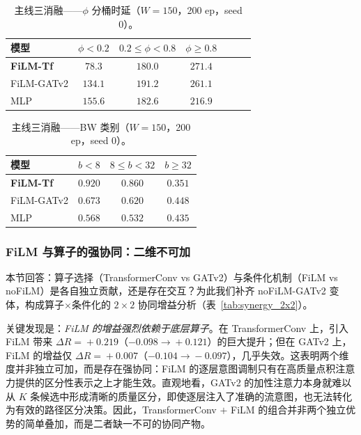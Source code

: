 \begin{table}[t]
\centering
\caption{主线三消融——$\phi$ 分桶时延（$W\!=\!150$，200 ep，seed 0）。}
\label{tab:conv_w150_phi}
\setlength{\tabcolsep}{3pt}
\begin{tabular}{lcccccc}

\toprule
模型 & $\phi<0.2$ & $0.2\!\le\!\phi\!<\!0.8$ & $\phi\!\ge\!0.8$ \\
\midrule
\textbf{FiLM-Tf} & $\mathbf{78.3}$ & $180.0$ & $271.4$ \\
FiLM-GATv2       & $134.1$ & $191.2$ & $261.1$ \\
MLP              & $155.6$ & $182.6$ & $216.9$ \\
\bottomrule

\end{tabular}
\end{table}

\begin{table}[t]
\centering
\caption{主线三消融——BW 类别（$W\!=\!150$，200 ep，seed 0）。}
\label{tab:conv_w150_bw}
\setlength{\tabcolsep}{3pt}
\begin{tabular}{lccc}
\toprule
模型 & $b<8$ & $8\!\le\!b\!<\!32$ & $b\!\ge\!32$ \\
\midrule
\textbf{FiLM-Tf} & $\mathbf{0.920}$ & $\mathbf{0.860}$ & $0.351$ \\
FiLM-GATv2       & $0.673$ & $0.620$ & $0.448$ \\
MLP              & $0.568$ & $0.532$ & $0.435$ \\
\bottomrule
\end{tabular}
\end{table}

\subsubsection{FiLM 与算子的强协同：二维不可加}
\label{sec:exp:synergy}

本节回答：算子选择（TransformerConv vs GATv2）与条件化机制（FiLM vs noFiLM）是各自独立贡献，还是存在交互？为此我们补齐 noFiLM-GATv2 变体，构成算子$\times$条件化的 $2\times2$ 协同增益分析（表~\ref{tab:synergy_2x2}）。

关键发现是：\emph{FiLM 的增益强烈依赖于底层算子}。在 TransformerConv 上，引入 FiLM 带来 $\Delta R\!=\!+0.219$（$-0.098\!\to\!+0.121$）的巨大提升；但在 GATv2 上，FiLM 的增益仅 $\Delta R\!=\!+0.007$（$-0.104\!\to\!-0.097$），几乎失效。这表明两个维度并非独立可加，而是存在强协同：FiLM 的逐层意图调制只有在高质量点积注意力提供的区分性表示之上才能生效。直观地看，GATv2 的加性注意力本身就难以从 $K$ 条候选中形成清晰的质量区分，即使逐层注入了准确的流意图，也无法转化为有效的路径区分决策。因此，TransformerConv $+$ FiLM 的组合并非两个独立优势的简单叠加，而是二者缺一不可的协同产物。

